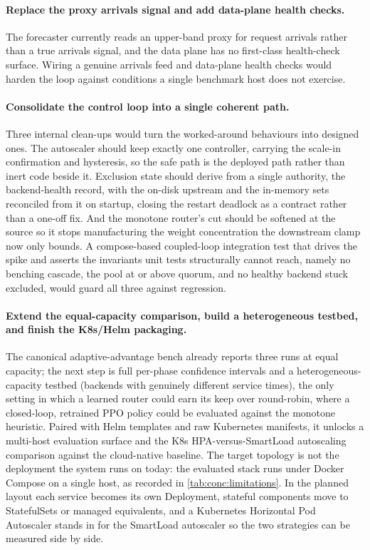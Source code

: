 \paragraph{Replace the proxy arrivals signal and add data-plane health checks.} The
forecaster currently reads an upper-band proxy for request arrivals rather than a true
arrivals signal, and the data plane has no first-class health-check surface. Wiring a
genuine arrivals feed and data-plane health checks would harden the loop against
conditions a single benchmark host does not exercise.

\paragraph{Consolidate the control loop into a single coherent path.} Three internal
clean-ups would turn the worked-around behaviours into designed ones. The autoscaler
should keep exactly one controller, carrying the scale-in confirmation and hysteresis, so
the safe path is the deployed path rather than inert code beside it. Exclusion state
should derive from a single authority, the backend-health record, with the on-disk
upstream and the in-memory sets reconciled from it on startup, closing the restart
deadlock as a contract rather than a one-off fix. And the monotone router's cut should be
softened at the source so it stops manufacturing the weight concentration the downstream
clamp now only bounds. A compose-based coupled-loop integration test that drives the
spike and asserts the invariants unit tests structurally cannot reach, namely no benching
cascade, the pool at or above quorum, and no healthy backend stuck excluded, would guard
all three against regression.

\paragraph{Extend the equal-capacity comparison, build a heterogeneous testbed, and
finish the K8s/Helm packaging.} The canonical adaptive-advantage bench already reports
three runs at equal capacity; the next step is full per-phase confidence intervals and a
heterogeneous-capacity testbed (backends with genuinely different service times), the
only setting in which a learned router could earn its keep over round-robin, where a
closed-loop, retrained PPO policy could be evaluated against the monotone heuristic.
Paired with Helm templates and raw Kubernetes manifests, it unlocks a multi-host
evaluation surface and the K8s HPA-versus-SmartLoad autoscaling comparison \cite{k8shpa} against the cloud-native
baseline. The target topology is not the deployment the system runs on today: the
evaluated stack runs under Docker Compose on a single host, as recorded in
\cref{tab:conc:limitations}. In the planned layout each service becomes
its own Deployment, stateful components move to StatefulSets or managed equivalents, and a
Kubernetes Horizontal Pod Autoscaler stands in for the SmartLoad autoscaler so the two
strategies can be measured side by side.

